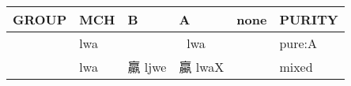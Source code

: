 \documentclass[14pt,a4paper]{scrartcl}
\begin{document}
\begin{longtable}[c]{@{}llllll@{}}
\toprule
\begin{minipage}[b]{0.14\columnwidth}\raggedright\strut
GROUP
\strut\end{minipage} &
\begin{minipage}[b]{0.14\columnwidth}\raggedright\strut
MCH
\strut\end{minipage} &
\begin{minipage}[b]{0.14\columnwidth}\raggedright\strut
B
\strut\end{minipage} &
\begin{minipage}[b]{0.14\columnwidth}\raggedright\strut
A
\strut\end{minipage} &
\begin{minipage}[b]{0.14\columnwidth}\raggedright\strut
none
\strut\end{minipage} &
\begin{minipage}[b]{0.14\columnwidth}\raggedright\strut
PURITY
\strut\end{minipage}\tabularnewline
\midrule
\endhead
\begin{minipage}[t]{0.14\columnwidth}\raggedright\strut
𦟀
\strut\end{minipage} &
\begin{minipage}[t]{0.14\columnwidth}\raggedright\strut
lwa
\strut\end{minipage} &
\begin{minipage}[t]{0.14\columnwidth}\raggedright\strut
\strut\end{minipage} &
\begin{minipage}[t]{0.14\columnwidth}\raggedright\strut
𦝠 lwa
\strut\end{minipage} &
\begin{minipage}[t]{0.14\columnwidth}\raggedright\strut
\strut\end{minipage} &
\begin{minipage}[t]{0.14\columnwidth}\raggedright\strut
pure:A
\strut\end{minipage}\tabularnewline
\begin{minipage}[t]{0.14\columnwidth}\raggedright\strut
𣎆
\strut\end{minipage} &
\begin{minipage}[t]{0.14\columnwidth}\raggedright\strut
lwa
\strut\end{minipage} &
\begin{minipage}[t]{0.14\columnwidth}\raggedright\strut
羸 ljwe
\strut\end{minipage} &
\begin{minipage}[t]{0.14\columnwidth}\raggedright\strut
蠃 lwaX
\strut\end{minipage} &
\begin{minipage}[t]{0.14\columnwidth}\raggedright\strut
\strut\end{minipage} &
\begin{minipage}[t]{0.14\columnwidth}\raggedright\strut
mixed
\strut\end{minipage}\tabularnewline
\bottomrule
\end{longtable}
\end{document}
